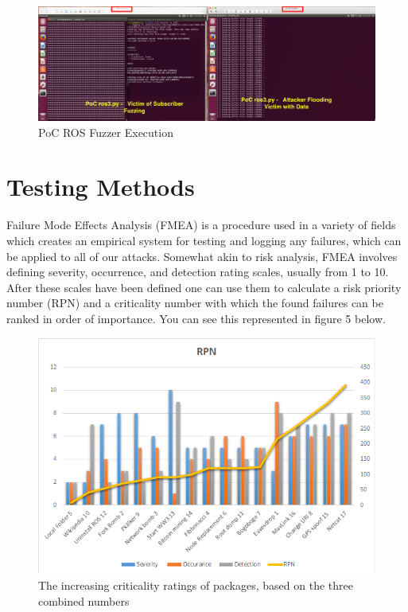 \documentclass[IEEEtran,letterpaper,10pt,notitlepage,draftclsnofoot]{article}
\begin{document}
\begin{figure}[H]
  \centering
    \includegraphics[width=\textwidth]{poc3}
    \caption{PoC ROS Fuzzer Execution}
\end{figure}

\section{Testing Methods}
Failure Mode Effects Analysis (FMEA) is a procedure used in a variety of fields which creates an empirical system for testing and logging any failures, which can be applied to all of our attacks. \cite{FMEA}
Somewhat akin to risk analysis, FMEA involves defining severity, occurrence, and detection rating scales, usually from 1 to 10.
After these scales have been defined one can use them to calculate a risk priority number (RPN) and a criticality number with which the found failures can be ranked in order of importance.
You can see this represented in figure 5 below.

\begin{figure}[H]
    \centering
    \includegraphics[width=\textwidth]{RPN}
    \caption{The increasing criticality ratings of packages, based on the three combined numbers}
\end{figure}
\end{document}
